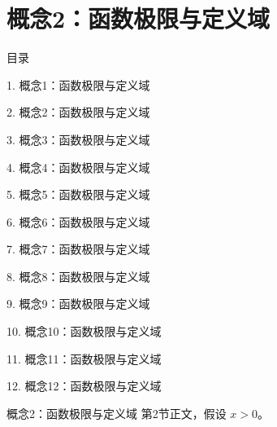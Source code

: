 \documentclass[aspectratio=169,10pt,fontset=fandol]{ctexbeamer}
\begin{document}
\section{概念2：函数极限与定义域}
\begin{frame}[t,fragile]{目录}
\small
{\color{black}\small 1. 概念1：函数极限与定义域\par}\vspace{0.22em}
{\color{blue}\small 2. 概念2：函数极限与定义域\par}\vspace{0.22em}
{\color{gray!40}\small 3. 概念3：函数极限与定义域\par}\vspace{0.22em}
{\color{gray!40}\small 4. 概念4：函数极限与定义域\par}\vspace{0.22em}
{\color{gray!40}\small 5. 概念5：函数极限与定义域\par}\vspace{0.22em}
{\color{gray!40}\small 6. 概念6：函数极限与定义域\par}\vspace{0.22em}
{\color{gray!40}\small 7. 概念7：函数极限与定义域\par}\vspace{0.22em}
{\color{gray!40}\small 8. 概念8：函数极限与定义域\par}\vspace{0.22em}
{\color{gray!40}\small 9. 概念9：函数极限与定义域\par}\vspace{0.22em}
{\color{gray!40}\small 10. 概念10：函数极限与定义域\par}\vspace{0.22em}
{\color{gray!40}\small 11. 概念11：函数极限与定义域\par}\vspace{0.22em}
{\color{gray!40}\small 12. 概念12：函数极限与定义域\par}\vspace{0.22em}
\end{frame}
\begin{frame}[t,fragile]{概念2：函数极限与定义域}
\normalsize
{\normalsize
第2节正文，假设 $x>0$。
}
\end{frame}
\end{document}
